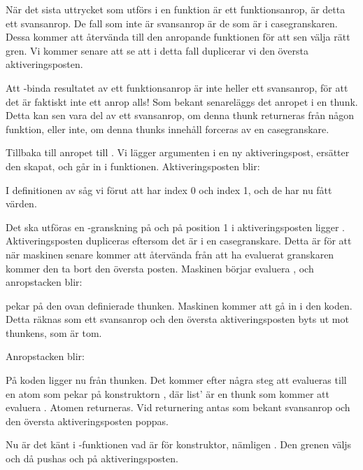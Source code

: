 \documentclass[../Core]{subfiles}
\begin{document}
När det sista uttrycket som utförs i en funktion är ett funktionsanrop, är
detta ett svansanrop. De fall som inte är svansanrop
är de som är i casegranskaren. Dessa kommer att återvända till den anropande
funktionen för att sen välja rätt gren. Vi kommer senare att se att i detta
fall duplicerar vi den översta aktiveringsposten. 

Att -binda resultatet av ett
funktionsanrop är inte heller ett svansanrop, för att det är faktiskt inte ett
anrop alls! Som bekant senareläggs det anropet i en thunk. Detta kan sen vara
del av ett svansanrop, om denna thunk returneras från någon funktion, eller inte,
om denna thunks innehåll forceras av en casegranskare.

Tillbaka till anropet till . 
Vi lägger argumenten i en ny aktiveringspost, ersätter den  skapat,
och går in i funktionen. 
Aktiveringsposten blir:
\begin{codeEx}
\end{codeEx}
I definitionen av  såg vi förut att  har index 0 och
 index 1, och de har nu fått värden.

Det ska utföras en -granskning på  och på position 1 i
aktiveringsposten ligger . Aktiveringsposten dupliceras eftersom
det är i en casegranskare. Detta är för att när maskinen senare kommer
att återvända från att ha evaluerat granskaren kommer den ta bort den 
översta posten. Maskinen börjar evaluera , och anropstacken blir:
\begin{codeEx}
\end{codeEx}

 pekar på den ovan definierade thunken. Maskinen kommer att gå in i den
koden. Detta räknas som ett svansanrop och den översta aktiveringsposten byts
ut mot thunkens, som är tom.

Anropstacken blir:
\begin{codeEx}
\end{codeEx}

På koden ligger nu  från thunken. 
Det kommer efter några steg att evalueras till en atom 
som pekar på 
konstruktorn , där list' är
en thunk som kommer att evaluera . 
Atomen
returneras. Vid returnering antas som bekant svansanrop och 
den översta aktiveringsposten poppas.


Nu är det känt i -funktionen vad  är för konstruktor, nämligen
. Den grenen väljs och då pushas  och 
 på aktiveringsposten. 
\end{document}
